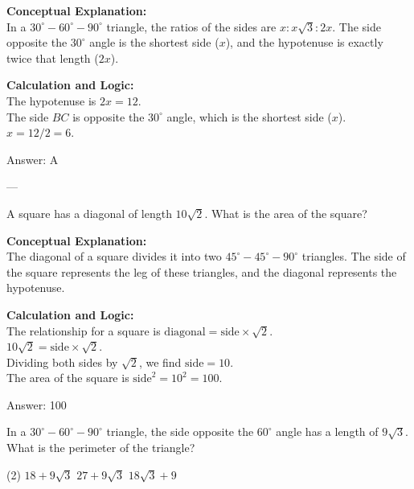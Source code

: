 \documentclass[11pt,paper=a4,answers]{exam}
\begin{document}
\begin{questions}
\begin{solution}
\textbf{Conceptual Explanation:} \\
In a $30^\circ-60^\circ-90^\circ$ triangle, the ratios of the sides are $x : x\sqrt{3} : 2x$. The side opposite the $30^\circ$ angle is the shortest side ($x$), and the hypotenuse is exactly twice that length ($2x$).

\vspace{10pt}
\textbf{Calculation and Logic:} \\
The hypotenuse is $2x = 12$. \\
The side $BC$ is opposite the $30^\circ$ angle, which is the shortest side ($x$). \\
$x = 12 / 2 = 6$.

\vspace{15pt}
Answer: \colorbox{yellow!100}{A}
\end{solution}

---

\question
A square has a diagonal of length $10\sqrt{2}$. What is the area of the square?

\begin{solution}
\textbf{Conceptual Explanation:} \\
The diagonal of a square divides it into two $45^\circ-45^\circ-90^\circ$ triangles. The side of the square represents the leg of these triangles, and the diagonal represents the hypotenuse.

\vspace{10pt}
\textbf{Calculation and Logic:} \\
The relationship for a square is $\text{diagonal} = \text{side} \times \sqrt{2}$. \\
$10\sqrt{2} = \text{side} \times \sqrt{2}$. \\
Dividing both sides by $\sqrt{2}$, we find $\text{side} = 10$. \\
The area of the square is $\text{side}^2 = 10^2 = 100$.

\vspace{15pt}
Answer: \colorbox{yellow!100}{100}
\end{solution}



\question
In a $30^\circ-60^\circ-90^\circ$ triangle, the side opposite the $60^\circ$ angle has a length of $9\sqrt{3}$. What is the perimeter of the triangle?
\begin{tasks}(2)
    \task $18 + 9\sqrt{3}$
    \task $27 + 9\sqrt{3}$
    \task $18\sqrt{3} + 9$
\end{tasks}


\end{questions}
\end{document}
